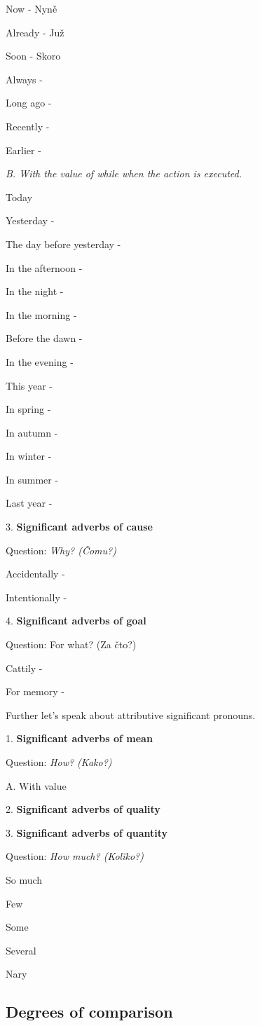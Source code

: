 Now - Nyně

Already - Juž

Soon - Skoro

Always - 

Long ago - 

Recently - 

Earlier - 

\textit{B. With the value of while when the action is executed.}

Today

Yesterday - 

The day before yesterday - 

In the afternoon - 

In the night - 

In the morning - 

Before the dawn - 

In the evening - 

This year - 

In spring - 

In autumn - 

In winter - 

In summer - 

Last year - 

3. \textbf{Significant adverbs of cause}

Question: \textit{Why? (Čomu?)}

Accidentally - 

Intentionally - 


4. \textbf{Significant adverbs of goal}

Question: For what? (Za čto?)

Cattily - 

For memory - 

Further let’s speak about attributive significant pronouns.

1. \textbf{Significant adverbs of mean}

Question: \textit{How? (Kako?)}

A. With value

2. \textbf{Significant adverbs of quality}


3.\textbf{ Significant adverbs of quantity}

Question: \textit{How much? (Kolïko?)}

So much

Few

Some

Several

Nary

\subsection{Degrees of comparison}

